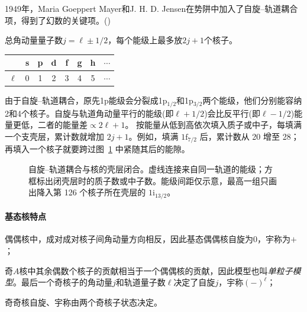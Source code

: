 1949年，Maria Goeppert Mayer和J. H. D. Jensen在势阱中加入了自旋--轨道耦合项，得到了幻数的关键项。()

总角动量量子数$j = \ell \pm 1/2$，每个能级上最多放$2j + 1$个核子。
\begin{notecaptionblock}
	\begin{tabular}{cccccccc}
		\toprule
		&s&p&d&f&g&h&$\cdots$\\
		\midrule
		$\ell$&0&1&2&3&4&5&$\cdots$\\
		\bottomrule
	\end{tabular}
\end{notecaptionblock}
由于自旋--轨道耦合，原先1p能级会分裂成1p$_{1/2}$和1p$_{3/2}$两个能级，他们分别能容纳2和4个核子。自旋与轨道角动量平行的能级(即$\ell + 1/2$)会比反平行(即$\ell - 1/2$)能量更低，二者的能量差$\propto 2\ell + 1$。
按能量从低到高依次填入质子或中子，每填满一个支壳层，累计数就增加 $2j + 1$。例如，填满 $1\mathrm f_{7/2}$ 后，累计数从 20 增至 28；再填入一个核子就要跨过图~\ref{fig:nrd-spin-orbit} 中紧随其后的能隙。
\begin{figure}[htbp]
    \centering
    \caption[自旋--轨道耦合与核的壳层闭合]{自旋--轨道耦合与核的壳层闭合。虚线连接来自同一轨道的能级；方框标出闭壳层时的质子数或中子数。能级间距仅示意，最高一组只画出降入第 126 个核子所在壳层的 $1\mathrm i_{13/2}$。}
    \label{fig:nrd-spin-orbit}
\end{figure}
\paragraph{基态核特点}
\begin{compactitem}
	\item 偶偶核中，成对成对核子间角动量方向相反，因此基态偶偶核自旋为0，宇称为$+$；
	\item 奇$A$核中其余偶数个核子的贡献相当于一个偶偶核的贡献，因此模型也叫\textit{单粒子模型}。最后一个奇核子的角动量$j$和轨道量子数$\ell$决定了自旋$j$，宇称$(-)^\ell$；
	\item 奇奇核自旋、宇称由两个奇核子状态决定。
\end{compactitem}

